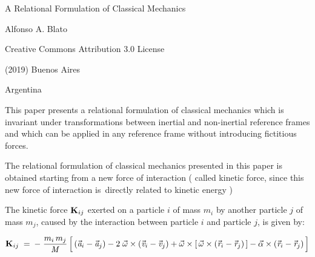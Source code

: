 \documentclass[10pt]{article}
\begin{document}
\begin{center}

{\Large A Relational Formulation of Classical Mechanics}

\bigskip \medskip

{\large Alfonso A. Blato}

\bigskip \medskip

\small

Creative Commons Attribution 3.0 License

\smallskip

(2019) Buenos Aires

\smallskip

Argentina

\smallskip

\bigskip \medskip

\parbox{102.00mm}{This paper presents a relational formulation of classical mechanics which is invariant under transformations between inertial and non-inertial \hbox {reference} frames and which can be applied in any reference frame without introducing fictitious forces.}

\end{center}

\normalsize

\vspace{-1.50em}

\par {}

\par \bigskip \noindent The relational formulation of classical mechanics presented in this paper is obtained starting from a new force of interaction ( called kinetic force, since this new force of interaction \hbox {is directly} related to kinetic energy )

\par \bigskip\smallskip \noindent The kinetic force ${\mathbf{K}}_{\hspace{+0.009em}ij}$ exerted on a particle $i$ of mass $m_i$ by another particle $j$ of mass $m_j$, caused by the interaction between particle $i$ and particle $j$, is given by:

\par \bigskip ${\mathbf{K}}_{\hspace{+0.009em}ij} \;=\: - \; \dfrac{m_i \, m_j}{\mathit{M}} \, \Big[ \, ({\vec{\mathit{a}}}_{i} - {\vec{\mathit{a}}}_{j}) - 2 \; {\vec{\omega}} \times ({\vec{\mathit{v}}}_{i} - {\vec{\mathit{v}}}_{j}) + {\vec{\omega}} \times [ \, {\vec{\omega}} \times ({\vec{\mathit{r}}}_{i} - {\vec{\mathit{r}}}_{j}) \, ] - {\vec{\alpha}} \times ({\vec{\mathit{r}}}_{i} - {\vec{\mathit{r}}}_{j}) \, \Big]$
\end{document}
